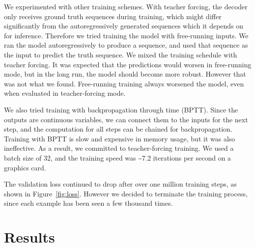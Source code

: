 \documentclass[11pt]{article}
\begin{document}
We experimented with other training schemes.
With teacher forcing, the decoder only receives ground truth sequences during training,
which might differ significantly from the autoregressively generated sequences
which it depends on for inference.
Therefore we tried training the model with free-running inputs.
We ran the model autoregressively to produce a sequence,
and used that sequence as the input to predict the truth sequence.
We mixed the training schedule with teacher forcing.
It was expected that the predictions would worsen in free-running mode,
but in the long run, the model should become more robust.
However that was not what we found.
Free-running training always worsened the model,
even when evaluated in teacher-forcing mode.

We also tried training with backpropagation through time (BPTT).
Since the outputs are continuous variables,
we can connect them to the inputs for the next step,
and the computation for all steps can be chained for backpropagation.
Training with BPTT is slow and expensive in memory usage,
but it was also ineffective.
As a result, we committed to teacher-forcing training.
We used a batch size of 32,
and the training speed was \textasciitilde{}7.2 iterations per second on a graphics card.

The validation loss continued to drop after over one million training steps,
as shown in Figure~\ref{fig:loss}.
However we decided to terminate the training process,
since each example has been seen a few thousand times.

\section{Results}\label{sec:results}
\end{document}
